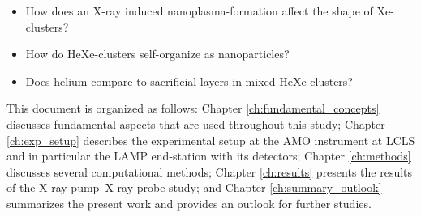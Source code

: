 \begin{itemize}
	\item How does an X-ray induced nanoplasma-formation affect the shape of Xe-clusters?
	\item How do HeXe-clusters self-organize as nanoparticles?
	\item Does helium compare to sacrificial layers in mixed HeXe-clusters?
\end{itemize}
%
This document is organized as follows: Chapter \ref{ch:fundamental_concepts} discusses fundamental aspects that are used throughout this study; Chapter \ref{ch:exp_setup} describes the experimental setup at the AMO instrument at LCLS and in particular the LAMP end-station with its detectors; Chapter \ref{ch:methods} discusses several computational methods; Chapter \ref{ch:results} presents the results of the X-ray pump--X-ray probe study; and Chapter \ref{ch:summary_outlook} summarizes the present work and provides an outlook for further studies.
%
%
%